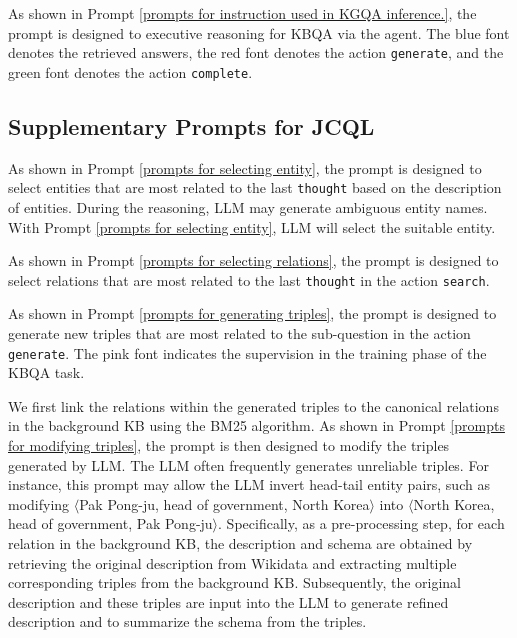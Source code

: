 As shown in Prompt \ref{prompts for instruction used in KGQA inference.}, the prompt is designed to executive reasoning for KBQA via the agent. \textcolor[rgb]{0,0.4392,0.7529}{The blue font} denotes the retrieved answers, \textcolor[rgb]{0.7529,0,0}{the red font} denotes the action \texttt{generate}, and \textcolor[rgb]{0.4549,0.7137,0.0078}{the green font} denotes the action \texttt{complete}.

% 

\subsection{Supplementary Prompts for JCQL}\label{appendix:prompt:supplementary}
As shown in Prompt \ref{prompts for selecting entity}, the prompt is designed to select entities that are most related to the last \texttt{thought} based on the description of entities. During the reasoning, LLM may generate ambiguous entity names. With Prompt \ref{prompts for selecting entity}, LLM will select the suitable entity.


As shown in Prompt \ref{prompts for selecting relations}, the prompt is designed to select relations that are most related to the last \texttt{thought} in the action \texttt{search}.


As shown in Prompt \ref{prompts for generating triples}, the prompt is designed to generate new triples that are most related to the sub-question in the action \texttt{generate}. \textcolor[rgb]{0.98,0.4,0.5}{The pink font} indicates the supervision in the training phase of the KBQA task.




We first link the relations within the generated triples to the canonical relations in the background KB using the BM25 algorithm. As shown in Prompt \ref{prompts for modifying triples}, the prompt is then designed to modify the triples generated by LLM. The LLM often frequently generates unreliable triples. For instance, this prompt may allow the LLM invert head-tail entity pairs, such as modifying $\langle$Pak Pong-ju, head of government, North Korea$\rangle$ into $\langle$North Korea, head of government, Pak Pong-ju$\rangle$. Specifically, as a pre-processing step, for each relation in the background KB, the description and schema are obtained by retrieving the original description from Wikidata and extracting multiple corresponding triples from the background KB. Subsequently, the original description and these triples are input into the LLM to generate refined description and to summarize the schema from the triples.



